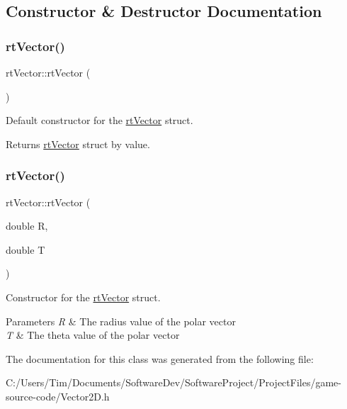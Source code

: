 \subsection{Constructor \& Destructor Documentation}
\mbox{\label{structrt_vector_a925c0326bc5d918e8bdb36a867b66228}} 
\subsubsection{\texorpdfstring{rt\+Vector()}{rtVector()}\hspace{0.1cm}{\footnotesize\ttfamily [1/2]}}
{\footnotesize\ttfamily rt\+Vector\+::rt\+Vector (\begin{DoxyParamCaption}{ }\end{DoxyParamCaption})\hspace{0.3cm}{\ttfamily [inline]}}



Default constructor for the \hyperlink{structrt_vector}{rt\+Vector} struct. 

\begin{DoxyReturn}{Returns}
\hyperlink{structrt_vector}{rt\+Vector} struct by value. 
\end{DoxyReturn}
\mbox{\label{structrt_vector_a97268ebbcad1df534201f5225f7ccbb0}} 
\subsubsection{\texorpdfstring{rt\+Vector()}{rtVector()}\hspace{0.1cm}{\footnotesize\ttfamily [2/2]}}
{\footnotesize\ttfamily rt\+Vector\+::rt\+Vector (\begin{DoxyParamCaption}\item[{double}]{R,  }\item[{double}]{T }\end{DoxyParamCaption})\hspace{0.3cm}{\ttfamily [inline]}}



Constructor for the \hyperlink{structrt_vector}{rt\+Vector} struct. 


\begin{DoxyParams}{Parameters}
{\em R} & The radius value of the polar vector \\
\hline
{\em T} & The theta value of the polar vector \\
\hline
\end{DoxyParams}


The documentation for this class was generated from the following file\+:\begin{DoxyCompactItemize}
\item 
C\+:/\+Users/\+Tim/\+Documents/\+Software\+Dev/\+Software\+Project/\+Project\+Files/game-\/source-\/code/Vector2\+D.\+h\end{DoxyCompactItemize}
